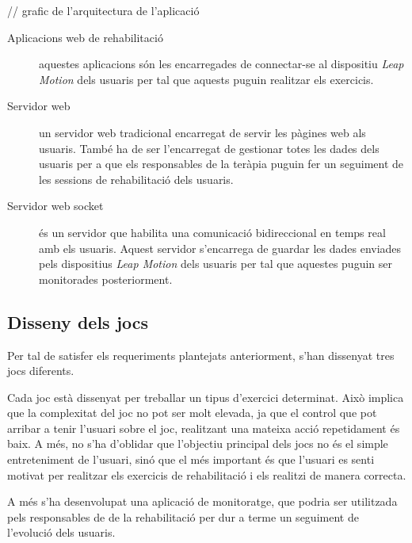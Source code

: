 \documentclass[12pt,a4paper,catalan]{article}
\begin{document}
	// grafic de l'arquitectura de l'aplicació
	
	\begin{description}
		\item [Aplicacions web de rehabilitació] aquestes aplicacions són les encarregades de connectar-se al dispositiu \textit{Leap Motion} dels usuaris per tal que aquests puguin realitzar els exercicis.
		\item [Servidor web] un servidor web tradicional encarregat de servir les pàgines web als usuaris. També ha de ser l'encarregat de gestionar totes les dades dels usuaris per a que els responsables de la teràpia puguin fer un seguiment de les sessions de rehabilitació dels usuaris.
		\item [Servidor web socket] és un servidor que habilita una comunicació bidireccional en temps real amb els usuaris. Aquest servidor s'encarrega de guardar les dades enviades pels dispositius \textit{Leap Motion} dels usuaris per tal que aquestes puguin ser monitorades posteriorment.
	\end{description}
	\subsection{Disseny dels jocs}
	Per tal de satisfer els requeriments plantejats anteriorment, s'han dissenyat tres jocs diferents.
	
	Cada joc està dissenyat per treballar un tipus d'exercici determinat. Això implica que la complexitat del joc no pot ser molt elevada, ja que el control que pot arribar a tenir l'usuari sobre el joc, realitzant una mateixa acció repetidament és baix. A més, no s'ha d'oblidar que l'objectiu principal dels jocs no és el simple entreteniment de l'usuari, sinó que el més important és que l'usuari es senti motivat per realitzar els exercicis de rehabilitació i els realitzi de manera correcta.
	
	A més s'ha desenvolupat una aplicació de monitoratge, que podria ser utilitzada pels responsables de de la rehabilitació per dur a terme un seguiment de l'evolució dels usuaris.
\end{document}
